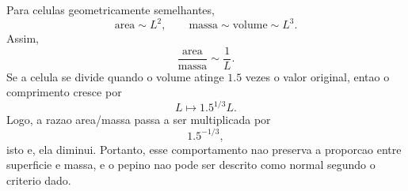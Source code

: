 Para celulas geometricamente semelhantes,
\[
\text{area} \sim L^2, \qquad \text{massa} \sim \text{volume} \sim L^3.
\]
Assim,
\[
\frac{\text{area}}{\text{massa}} \sim \frac{1}{L}.
\]
Se a celula se divide quando o volume atinge $1.5$ vezes o valor original, entao o comprimento cresce por
\[
L \mapsto 1.5^{1/3}L.
\]
Logo, a razao area/massa passa a ser multiplicada por
\[
1.5^{-1/3},
\]
isto e, ela diminui. Portanto, esse comportamento nao preserva a proporcao entre superficie e massa, e o pepino nao pode ser descrito como normal segundo o criterio dado.

